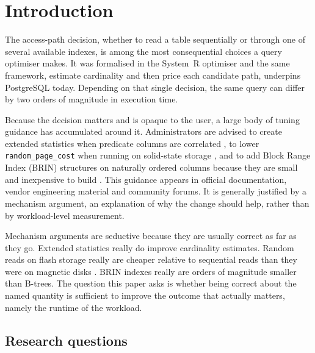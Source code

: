 \documentclass[preprint,12pt,authoryear]{elsarticle}
\newcommand{\rpc}{\texttt{random\_page\_cost}}
\begin{document}
\section{Introduction}
\label{sec:intro}

The access-path decision, whether to read a table sequentially or
through one of several available indexes, is among the most
consequential choices a query optimiser makes. It was formalised in the
System~R optimiser \citep{selinger1979access} and the same framework,
estimate cardinality and then price each candidate path, underpins
PostgreSQL today. Depending on that single decision, the same query can
differ by two orders of magnitude in execution time.

Because the decision matters and is opaque to the user, a large body of
tuning guidance has accumulated around it. Administrators are advised to
create extended statistics when predicate columns are correlated
\citep{pgdocs17createstats}, to lower \rpc{} when running on
solid-state storage \citep{pgdocs17runtimeconfig}, and to add
Block Range Index (BRIN) structures on naturally ordered columns
because they are small and inexpensive to build \citep{pgdocs17brin}.
This guidance appears in official documentation, vendor engineering
material and community forums. It is generally justified by a mechanism
argument, an explanation of why the change should help, rather than by
workload-level measurement.

Mechanism arguments are seductive because they are usually correct as
far as they go. Extended statistics really do improve cardinality
estimates. Random reads on flash storage really are cheaper relative to
sequential reads than they were on magnetic disks
\citep{graefe2009fast,lee2009advances}. BRIN indexes really are orders
of magnitude smaller than B-trees. The question this paper asks is
whether being correct about the named quantity is sufficient to improve
the outcome that actually matters, namely the runtime of the workload.

\subsection{Research questions}
\end{document}
